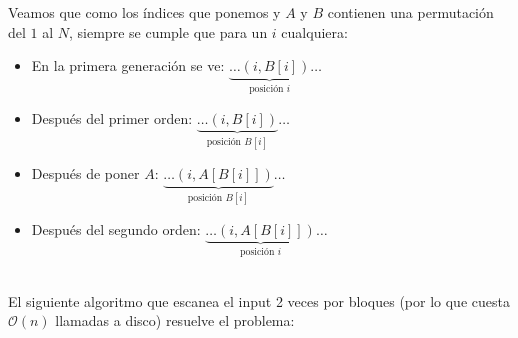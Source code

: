 \documentclass[dcc,uchile]{fcfmcourse}
\begin{document}
\begin{problems}
Veamos que como los índices que ponemos y $A$ y $B$ contienen una permutación del $1$ al $N$, siempre se cumple que para un $i$ cualquiera:
\begin{itemize}
    \item En la primera generación  se ve: $\underbrace{\ldots (i, B[i])}_\text{posición $i$}\ldots$
    \item Después del primer orden: $\underbrace{\ldots (i, B[i])}_\text{posición $B[i]$}\ldots$
    \item Después de poner $A$: $\underbrace{\ldots (i, A[B[i]])}_\text{posición $B[i]$}\ldots$
    \item Después del segundo orden: $\underbrace{\ldots (i, A[B[i]])}_\text{posición $i$}\ldots$ \magic
\end{itemize}
\\
El siguiente algoritmo que escanea el input 2 veces por bloques (por lo que cuesta $\mathcal{O}(n)$ llamadas a disco) resuelve el problema:\\


\end{problems}
\end{document}
